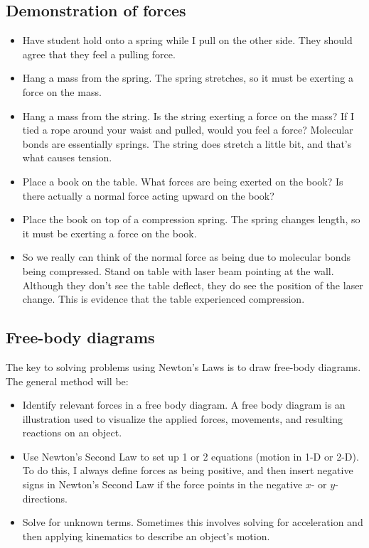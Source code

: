 \subsection{Demonstration of forces}
\begin{itemize}
\item Have student hold onto a spring while I pull on the other side. They should agree that they feel a pulling force.
\item Hang a mass from the spring. The spring stretches, so it must be exerting a force on the mass.
\item Hang a mass from the string. Is the string exerting a force on the mass? If I tied a rope around your waist and pulled, would you feel a force? Molecular bonds are essentially springs. The string does stretch a little bit, and that's what causes tension.
\item Place a book on the table. What forces are being exerted on the book? Is there actually a normal force acting upward on the book?
\item Place the book on top of a compression spring. The spring changes length, so it must be exerting a force on the book.
\item So we really can think of the normal force as being due to molecular bonds being compressed. Stand on table with laser beam pointing at the wall. Although they don't see the table deflect, they do see the position of the laser change. This is evidence that the table experienced compression.
\end{itemize}

\subsection{Free-body diagrams}
The key to solving problems using Newton's Laws is to draw free-body diagrams. The general method will be:
\begin{itemize}
\item Identify relevant forces in a free body diagram. A free body diagram is an illustration used to visualize the applied forces, movements, and resulting reactions on an object.
\item Use Newton's Second Law to set up 1 or 2 equations (motion in 1-D or 2-D). To do this, I always define forces as being positive, and then insert negative signs in Newton's Second Law if the force points in the negative $x$- or $y$-directions.
\item Solve for unknown terms. Sometimes this involves solving for acceleration and then applying kinematics to describe an object's motion.
\end{itemize}

